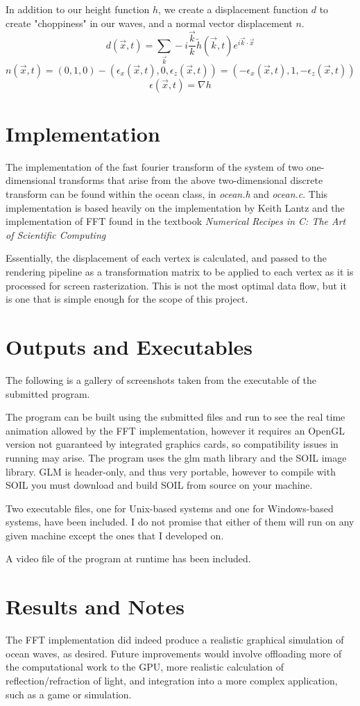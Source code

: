 \documentclass[11pt]{article} %
\begin{document}
\par In addition to our height function $h$, we create a displacement function $d$ to create "choppiness" in our waves, and a normal vector displacement $n$.
	$$d(\vec{x},t) = \sum_{\vec{k}} - i \frac{\vec{k}}{k}\tilde{h}(\vec{k},t)e^{i\vec{k} \cdot \vec{x}}$$
	$$n(\vec{x},t) = (0,1,0) - (\epsilon_x(\vec{x},t),0,\epsilon_z(\vec{x},t)) = (-\epsilon_x(\vec{x},t),1,-\epsilon_z(\vec{x},t))$$
	$$\epsilon(\vec{x},t) = \nabla h$$
\section*{Implementation}
The implementation of the fast fourier transform of the system of two one-dimensional transforms that arise from the above two-dimensional discrete transform can be found within the ocean class, in \textit{ocean.h} and \textit{ocean.c}. This implementation is based heavily on the implementation by Keith Lantz and the implementation of FFT found in the textbook \textit{Numerical Recipes in C: The Art of Scientific Computing}
\par Essentially, the displacement of each vertex is calculated, and passed to the rendering pipeline as a transformation matrix to be applied to each
vertex as it is processed for screen rasterization. This is not the most optimal data flow, but it is one that is simple enough for the scope of this project.
\section*{Outputs and Executables}

The following is a gallery of screenshots taken from the executable of the submitted program.


\par The program can be built using the submitted files and run to see the real time animation allowed by the FFT implementation, however
it requires an OpenGL version not guaranteed by integrated graphics cards, so compatibility issues in running may arise. The program uses the 
glm math library and the SOIL image library. GLM is header-only, and thus very portable, however to compile with SOIL you must download and
build SOIL from source on your machine.

\par Two executable files, one for Unix-based systems and one for Windows-based systems, have been included. I do not promise that either of them
will run on any given machine except the ones that I developed on.

\par A video file of the program at runtime has been included.

\section*{Results and Notes}

The FFT implementation did indeed produce a realistic graphical simulation of ocean waves, as desired. Future improvements would involve offloading more of the computational work to the GPU, more realistic calculation of reflection/refraction of light, and integration into a more complex application, such as a game or simulation.
\end{document}
